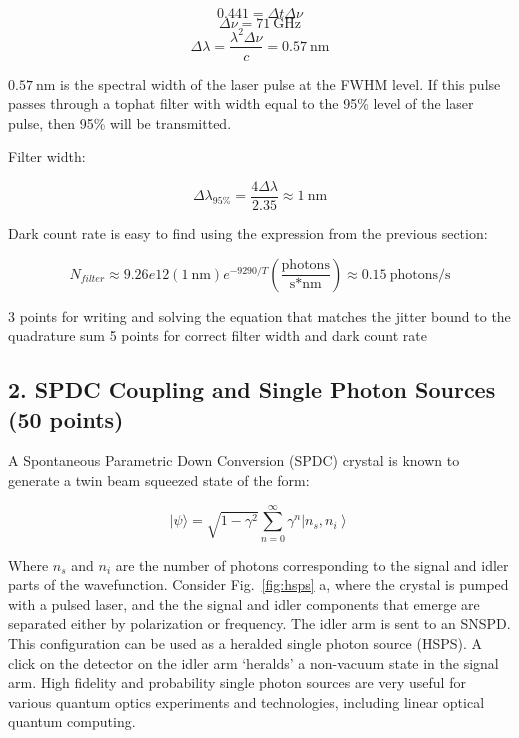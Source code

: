 \documentclass[12pt]{caltech_thesis}
\begin{document}
\begin{enumerate}
{  }

  {\color{midnightblue} 

  \[ 0.441 = \Delta t \Delta \nu \] \[\Delta \nu = 71~\text{GHz}\]
  \[\Delta \lambda = \frac{\lambda^2 \Delta \nu}{c} = 0.57~\text{nm}\]

  }

  {\color{midnightblue}  \(0.57~\text{nm}\) is the spectral width of the
  laser pulse at the FWHM level. If this pulse passes through a tophat
  filter with width equal to the 95\% level of the laser pulse, then
  95\% will be transmitted. }

  {\color{midnightblue} Filter width: }

  {\color{midnightblue} 

  \[\Delta \lambda_{95\%} = \frac{4 \Delta \lambda}{2.35} \approx \boxed{1~\text{nm}} \]

  }

  {\color{midnightblue} Dark count rate is easy to find using the
  expression from the previous section: }

  {\color{midnightblue} 

  \[\boxed{N_{filter} \approx 9.26e12 (1~\text{nm}) e^{-9290/T} (\frac{\text{photons}}{\text{s*nm}})} \approx 0.15~\text{photons/s} \]

  }

  {\color{darkred} 3 points for writing and solving the equation that
  matches the jitter bound to the quadrature sum } {\color{darkred} 5
  points for correct filter width and dark count rate}
\end{enumerate}

\hypertarget{spdc-coupling-and-single-photon-sources-50-points}{%
\subsection{2. SPDC Coupling and Single Photon Sources (50
points)}\label{spdc-coupling-and-single-photon-sources-50-points}}

A Spontaneous Parametric Down Conversion (SPDC) crystal is known to
generate a twin beam squeezed state of the form:

\[|\psi\rangle= \sqrt{1 - \gamma^2} \sum_{n=0}^{\infty} \gamma^{n}\left|n_{s}, n_{i}\right\rangle \]

Where \(n_s\) and \(n_i\) are the number of photons corresponding to the
signal and idler parts of the wavefunction. Consider Fig.~\ref{fig:hsps}
a, where the crystal is pumped with a pulsed laser, and the the signal
and idler components that emerge are separated either by polarization or
frequency. The idler arm is sent to an SNSPD. This configuration can be
used as a heralded single photon source (HSPS). A click on the detector
on the idler arm `heralds' a non-vacuum state in the signal arm. High
fidelity and probability single photon sources are very useful for
various quantum optics experiments and technologies, including linear
optical quantum computing.
\end{document}

